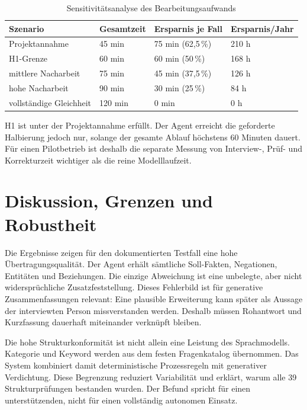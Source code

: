 \documentclass[
  10pt,
  ngerman,
  a4paper,
  toc=graduated,
  numbers=noenddot,
  headings=standardclasses
]{scrartcl}
\newcommand{\pct}[1]{#1\,\%}
\begin{document}
\begin{table}[H]
\centering
\small
\begin{tabularx}{\textwidth}{Y C{2.2cm}C{2.5cm}C{2.6cm}}
\toprule
{}
\textbf{Szenario} & \textbf{Gesamtzeit} & \textbf{Ersparnis je Fall} & \textbf{Ersparnis/Jahr}\\
\midrule
Projektannahme & 45 min & 75 min (\pct{62{,}5}) & 210 h\\
H1-Grenze & 60 min & 60 min (\pct{50}) & 168 h\\
mittlere Nacharbeit & 75 min & 45 min (\pct{37{,}5}) & 126 h\\
hohe Nacharbeit & 90 min & 30 min (\pct{25}) & 84 h\\
vollständige Gleichheit & 120 min & 0 min & 0 h\\
\bottomrule
\end{tabularx}
\caption{Sensitivitätsanalyse des Bearbeitungsaufwands}
\label{tab:sensitivitaet}
\end{table}

H1 ist unter der Projektannahme erfüllt. Der Agent erreicht die geforderte Halbierung jedoch nur, solange der gesamte Ablauf höchstens 60 Minuten dauert. Für einen Pilotbetrieb ist deshalb die separate Messung von Interview-, Prüf- und Korrekturzeit wichtiger als die reine Modelllaufzeit.

\newpage
\section{Diskussion, Grenzen und Robustheit}

Die Ergebnisse zeigen für den dokumentierten Testfall eine hohe Übertragungsqualität. Der Agent erhält sämtliche Soll-Fakten, Negationen, Entitäten und Beziehungen. Die einzige Abweichung ist eine unbelegte, aber nicht widersprüchliche Zusatzfeststellung. Dieses Fehlerbild ist für generative Zusammenfassungen relevant: Eine plausible Erweiterung kann später als Aussage der interviewten Person missverstanden werden. Deshalb müssen Rohantwort und Kurzfassung dauerhaft miteinander verknüpft bleiben.

Die hohe Strukturkonformität ist nicht allein eine Leistung des Sprachmodells. Kategorie und Keyword werden aus dem festen Fragenkatalog übernommen. Das System kombiniert damit deterministische Prozessregeln mit generativer Verdichtung. Diese Begrenzung reduziert Variabilität und erklärt, warum alle 39 Strukturprüfungen bestanden wurden. Der Befund spricht für einen unterstützenden, nicht für einen vollständig autonomen Einsatz.
\end{document}
